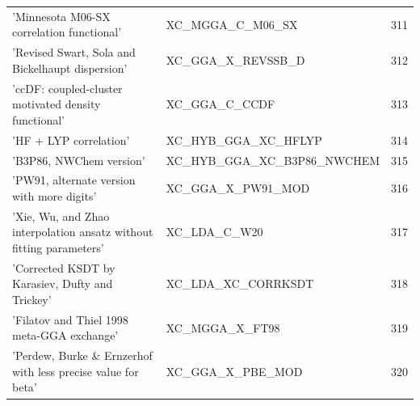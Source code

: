 \documentclass[final,12pt]{article}
\begin{document}
{{{{{{\begin{table}[!h]
\begin{center}
\begin{tabular}{llr}
  'Minnesota M06-SX correlation functional' & XC\_MGGA\_C\_M06\_SX  &311\\
  'Revised Swart, Sola and Bickelhaupt dispersion' & XC\_GGA\_X\_REVSSB\_D  &312\\
  'ccDF: coupled-cluster motivated density functional' & XC\_GGA\_C\_CCDF  &313\\
  'HF + LYP correlation' & XC\_HYB\_GGA\_XC\_HFLYP  &314\\
  'B3P86, NWChem version' & XC\_HYB\_GGA\_XC\_B3P86\_NWCHEM  &315\\
  'PW91, alternate version with more digits' & XC\_GGA\_X\_PW91\_MOD  &316\\
  'Xie, Wu, and Zhao interpolation ansatz without fitting parameters' & XC\_LDA\_C\_W20  &317\\
  'Corrected KSDT by Karasiev, Dufty and Trickey' & XC\_LDA\_XC\_CORRKSDT  &318\\
  'Filatov and Thiel 1998 meta-GGA exchange' & XC\_MGGA\_X\_FT98  &319\\
  'Perdew, Burke \& Ernzerhof with less precise value for beta' & XC\_GGA\_X\_PBE\_MOD  &320\\
\hline
\hline
\end{tabular}
\end{center}
\end{table}

}}}}}}
\end{document}
